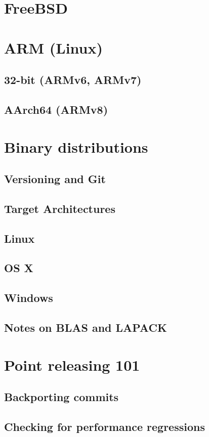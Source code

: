     \section{FreeBSD}
    \section{ARM (Linux)}
    \subsection{32-bit (ARMv6, ARMv7)}
    \subsection{AArch64 (ARMv8)}
    \section{Binary distributions}
    \subsection{Versioning and Git}
    \subsection{Target Architectures}
    \subsection{Linux}
    \subsection{OS X}
    \subsection{Windows}
    \subsection{Notes on BLAS and LAPACK}
    \section{Point releasing 101}
    \subsection{Backporting commits}
    \subsection{Checking for performance regressions}
